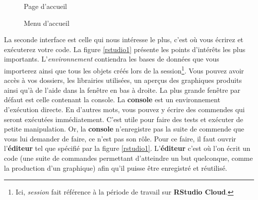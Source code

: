 \documentclass[10.5pt,a4paper]{article}
\begin{document}
\begin{figure}[H]
  \centering
  \caption{Page d'accueil}
  \label{home}
\end{figure}

\begin{figure}[H]
  \centering
  \caption{Menu d'accueil}
  \label{homeMenu}
\end{figure}

  La seconde interface est celle qui nous intéresse le plus, c'est où vous écrirez et exécuterez votre code. La figure \ref{rstudio1} présente les points d'intérêts les plus importants. L'\emph{environnement} contiendra les bases de données que vous importerez ainsi que tous les objets créés lors de la session\footnote{Ici, \emph{session} fait référence à la période de travail sur \textbf{RStudio Cloud}.}. Vous pouvez avoir accès à vos dossiers, les librairies utilisées, un aperçus des graphiques produits ainsi qu'à de l'aide dans la fenêtre en bas à droite. La plus grande fenêtre par défaut est celle contenant la console. La \textbf{console} est un environnement d'exécution directe. En d'autres mots, vous pouvez y écrire des commendes qui seront exécutées immédiatement. C'est utile pour faire des tests et exécuter de petite manipulation. Or, la \textbf{console} n'enregistre pas la suite de commende que vous lui demander de faire, ce n'est pas son rôle. Pour ce faire, il faut ouvrir l'\textbf{éditeur} tel que spécifié par la figure \ref{rstudio1}. L'\textbf{éditeur} c'est où l'on écrit un code (une suite de commandes permettant d'atteindre un but quelconque, comme la production d'un graphique) afin qu'il puisse être enregistré et réutilisé.  
  
\end{document}
